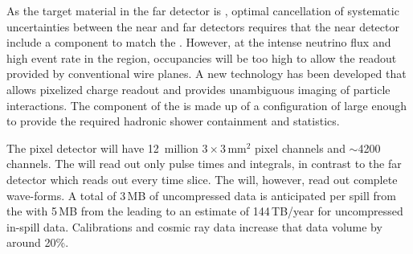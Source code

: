 \documentclass[../main-v1.tex]{subfiles}
\begin{document}
 As the target material in the %
 far detector is , optimal cancellation of systematic uncertainties between the near and far detectors requires that the near detector include a   component to match the .  However, at the intense neutrino flux and high event rate in the  region, occupancies will be too high to allow the \twod readout provided by conventional wire planes. A new   technology has been developed that allows pixelized charge readout  and provides unambiguous \threed imaging of  particle interactions.  The  component of the  is made up of a configuration of     large enough to provide the required hadronic shower containment and statistics.  %
 
 The pixel  detector will have 12~million $3 \times 3$\,mm$^2$ pixel channels and $\sim$4200  channels.  The  will read out only pulse times and integrals, in contrast to the far detector which reads out every time slice.  The  will, however, read out complete wave-forms.   A total of 3\,MB of uncompressed data is anticipated per spill from the  with 5\,MB from the  leading to an estimate of 144\,TB/year for uncompressed in-spill data. Calibrations and cosmic ray data increase that data volume by around 20\%.


\end{document}
